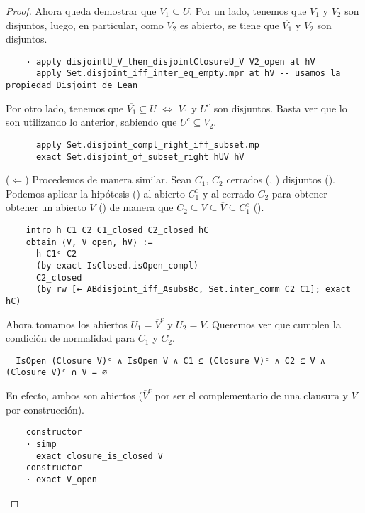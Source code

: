 \begin{proof}
  Ahora queda demostrar que $\overline{V_1} \subseteq U$. Por un lado, tenemos que $V_1$ y $V_2$ son disjuntos, luego, en particular, como $V_2$ es abierto, se tiene que $\overline{V_1}$ y $V_2$ son disjuntos.

\begin{lstlisting}
    · apply disjointU_V_then_disjointClosureU_V V2_open at hV
      apply Set.disjoint_iff_inter_eq_empty.mpr at hV -- usamos la propiedad Disjoint de Lean
\end{lstlisting}

  Por otro lado, tenemos que $\overline{V_1} \subseteq U$ $\iff$ $V_1$ y $U^c$ son disjuntos. Basta ver que lo son utilizando lo anterior, sabiendo que $U^c \subseteq V_2$.

\begin{lstlisting}
      apply Set.disjoint_compl_right_iff_subset.mp
      exact Set.disjoint_of_subset_right hUV hV
\end{lstlisting}

  ($\Longleftarrow$) Procedemos de manera similar. Sean $C_1$, $C_2$ cerrados (, ) disjuntos (). Podemos aplicar la hipótesis () al abierto $C_1^c$ y al cerrado $C_2$ para obtener obtener un abierto $V$ () de manera que $C_2 \subseteq V \subseteq \overline{V} \subseteq C_1^c$ ().

\begin{lstlisting}
    intro h C1 C2 C1_closed C2_closed hC
    obtain ⟨V, V_open, hV⟩ :=
      h C1ᶜ C2
      (by exact IsClosed.isOpen_compl)
      C2_closed
      (by rw [← ABdisjoint_iff_AsubsBc, Set.inter_comm C2 C1]; exact hC)
\end{lstlisting}

  Ahora tomamos los abiertos $U_1 = \overline{V}^c$ y $U_2 = V$. Queremos ver que cumplen la condición de normalidad para $C_1$ y $C_2$.
  
\begin{lstlisting}
  IsOpen (Closure V)ᶜ ∧ IsOpen V ∧ C1 ⊆ (Closure V)ᶜ ∧ C2 ⊆ V ∧ (Closure V)ᶜ ∩ V = ∅
\end{lstlisting}
  
  En efecto, ambos son abiertos ($\overline{V}^c$ por ser el complementario de una clausura y $V$ por construcción).

\begin{lstlisting}
    constructor
    · simp
      exact closure_is_closed V
    constructor
    · exact V_open
\end{lstlisting}


\end{proof}
